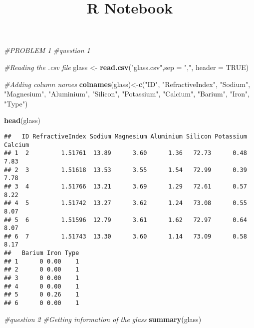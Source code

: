 \documentclass[]{article}
\title{R Notebook}
\author{}
\date{}
\newenvironment{Shaded}{\begin{snugshade}}{\end{snugshade}}
\newcommand{\KeywordTok}[1]{\textcolor[rgb]{0.13,0.29,0.53}{\textbf{#1}}}
\newcommand{\DataTypeTok}[1]{\textcolor[rgb]{0.13,0.29,0.53}{#1}}
\newcommand{\StringTok}[1]{\textcolor[rgb]{0.31,0.60,0.02}{#1}}
\newcommand{\CommentTok}[1]{\textcolor[rgb]{0.56,0.35,0.01}{\textit{#1}}}
\newcommand{\OtherTok}[1]{\textcolor[rgb]{0.56,0.35,0.01}{#1}}
\newcommand{\NormalTok}[1]{#1}
\begin{document}
\maketitle

\begin{Shaded}
\begin{Highlighting}[]
\CommentTok{#PROBLEM 1}
\CommentTok{#question 1}

\CommentTok{#Reading the .csv file}
\NormalTok{glass <-}\StringTok{ }\KeywordTok{read.csv}\NormalTok{(}\StringTok{"glass.csv"}\NormalTok{,}\DataTypeTok{sep =} \StringTok{","}\NormalTok{, }\DataTypeTok{header =} \OtherTok{TRUE}\NormalTok{)}

\CommentTok{#Adding column names}
\KeywordTok{colnames}\NormalTok{(glass)<-}\KeywordTok{c}\NormalTok{(}\StringTok{"ID"}\NormalTok{, }\StringTok{"RefractiveIndex"}\NormalTok{, }\StringTok{"Sodium"}\NormalTok{, }\StringTok{"Magnesium"}\NormalTok{, }\StringTok{"Aluminium"}\NormalTok{, }\StringTok{"Silicon"}\NormalTok{, }\StringTok{"Potassium"}\NormalTok{, }\StringTok{"Calcium"}\NormalTok{, }\StringTok{"Barium"}\NormalTok{, }\StringTok{"Iron"}\NormalTok{, }\StringTok{"Type"}\NormalTok{)}


\KeywordTok{head}\NormalTok{(glass)}
\end{Highlighting}
\end{Shaded}

\begin{verbatim}
##   ID RefractiveIndex Sodium Magnesium Aluminium Silicon Potassium Calcium
## 1  2         1.51761  13.89      3.60      1.36   72.73      0.48    7.83
## 2  3         1.51618  13.53      3.55      1.54   72.99      0.39    7.78
## 3  4         1.51766  13.21      3.69      1.29   72.61      0.57    8.22
## 4  5         1.51742  13.27      3.62      1.24   73.08      0.55    8.07
## 5  6         1.51596  12.79      3.61      1.62   72.97      0.64    8.07
## 6  7         1.51743  13.30      3.60      1.14   73.09      0.58    8.17
##   Barium Iron Type
## 1      0 0.00    1
## 2      0 0.00    1
## 3      0 0.00    1
## 4      0 0.00    1
## 5      0 0.26    1
## 6      0 0.00    1
\end{verbatim}

\begin{Shaded}
\begin{Highlighting}[]
\CommentTok{#question 2}
\CommentTok{#Getting information of the glass}
\KeywordTok{summary}\NormalTok{(glass)}
\end{Highlighting}
\end{Shaded}
\end{document}
